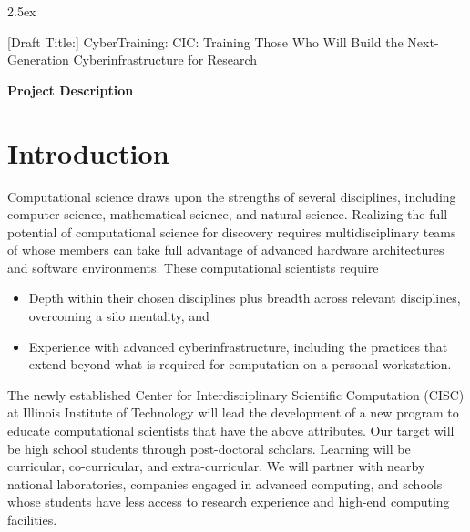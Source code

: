 \documentclass[11pt]{NSFamsart}
\begin{document}
\leftmargini2.5ex %

[Draft Title:]  	CyberTraining: CIC:  Training Those Who Will Build the Next-Generation Cyberinfrastructure for Research

\centerline{\Large \textbf{Project Description}}
\vspace{-2ex}

\setcounter{tocdepth}{1}
\tableofcontents %

\vspace{-6ex}

\section{Introduction}
Computational science draws upon the strengths of several disciplines, including computer science, mathematical science, and natural science.  Realizing the full potential of computational science for discovery requires multidisciplinary teams of whose members can take full advantage of advanced hardware architectures and software environments.  These computational scientists require

\begin{itemize}
\item Depth within their chosen disciplines plus breadth across relevant disciplines, overcoming a silo mentality, and
\item Experience with advanced cyberinfrastructure, including the practices that extend beyond what is required for computation on a personal workstation.
\end{itemize}

The newly established Center for Interdisciplinary Scientific Computation (CISC) at Illinois Institute of Technology will lead the development of a new program to educate computational scientists that have the above attributes.  Our target will be high school students through post-doctoral scholars.  Learning will be curricular, co-curricular, and extra-curricular.  We will partner with nearby national laboratories, companies engaged in advanced computing, and schools whose students have less access to research experience and high-end computing facilities.
\end{document}
